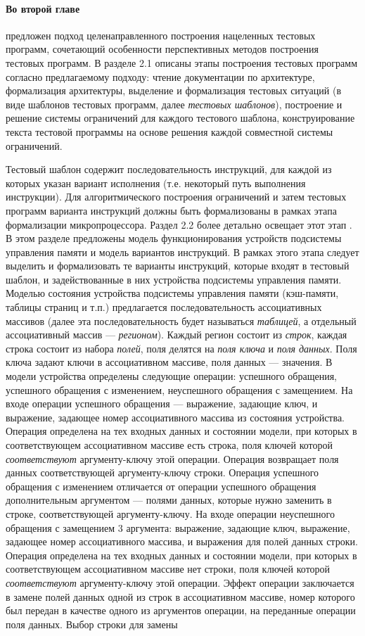 \documentclass[14pt,autoref,href
,facsimile
]{disser}
\begin{document}
\paragraph{Во второй главе} предложен подход целенаправленного построения нацеленных тестовых программ, сочетающий особенности перспективных методов построения тестовых программ. В разделе 2.1 описаны этапы построения тестовых программ согласно предлагаемому подходу: чтение документации по архитектуре, формализация архитектуры, выделение и формализация тестовых ситуаций (в виде шаблонов тестовых программ, далее \emph{тестовых шаблонов}), построение и решение системы ограничений для каждого тестового шаблона, конструирование текста тестовой программы на основе решения каждой совместной системы ограничений.

Тестовый шаблон содержит последовательность инструкций, для каждой из которых указан вариант исполнения (т.е. некоторый путь выполнения инструкции). Для алгоритмического построения ограничений и затем тестовых программ варианта инструкций должны быть формализованы в рамках этапа формализации микропроцессора. Раздел 2.2 более детально освещает этот этап . В этом разделе предложены модель функционирования устройств подсистемы управления памяти и модель вариантов инструкций. В рамках этого этапа следует выделить и формализовать те варианты инструкций, которые входят в тестовый шаблон, и задействованные в них устройства подсистемы управления памяти. Моделью состояния устройства подсистемы управления памяти (кэш-памяти, таблицы страниц и т.п.) предлагается последовательность ассоциативных массивов (далее эта последовательность будет называться \emph{таблицей}, а отдельный ассоциативный массив --- \emph{регионом}). Каждый регион состоит из \emph{строк}, каждая строка состоит из набора \emph{полей}, поля делятся на \emph{поля ключа} и \emph{поля данных}. Поля ключа задают ключи в ассоциативном массиве, поля данных --- значения. В модели устройства определены следующие операции: успешного обращения, успешного обращения с изменением, неуспешного обращения с замещением. На входе операции успешного обращения --- выражение, задающие ключ, и выражение, задающее номер ассоциативного массива из состояния устройства. Операция определена на тех входных данных и состоянии модели, при которых в соответствующем ассоциативном массиве есть строка, поля ключей которой \emph{соответствуют} аргументу-ключу этой операции. Операция возвращает поля данных соответствующей аргументу-ключу строки. Операция успешного обращения с изменением отличается от операции успешного обращения дополнительным аргументом --- полями данных, которые нужно заменить в строке, соответствующей аргументу-ключу. На входе операции  неуспешного обращения с замещением 3 аргумента: выражение, задающие ключ, выражение, задающее номер ассоциативного массива, и выражения для полей данных строки. Операция определена на тех входных данных и состоянии модели, при которых в соответствующем ассоциативном массиве нет строки, поля ключей которой \emph{соответствуют} аргументу-ключу этой операции. Эффект операции заключается в замене полей данных одной из строк в ассоциативном массиве, номер которого был передан в качестве одного из аргументов операции, на переданные операции поля данных. Выбор строки для замены 
\end{document}
